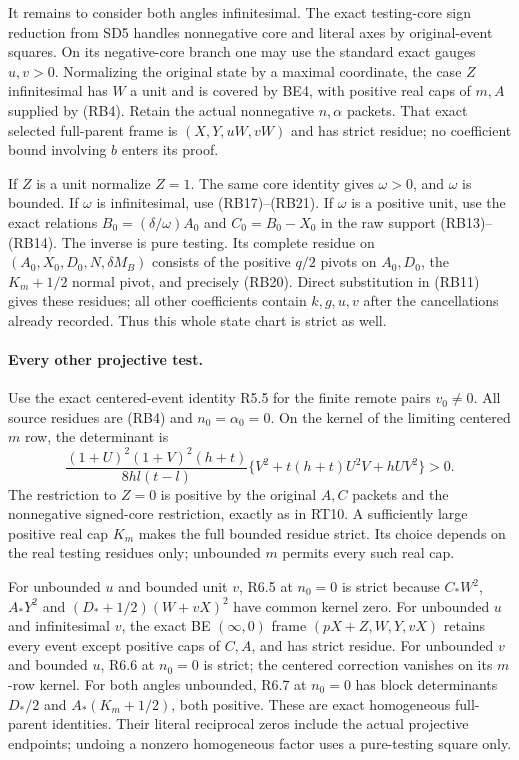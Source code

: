 It remains to consider both angles infinitesimal. The exact testing-core
sign reduction from SD5 handles nonnegative core and literal axes by
original-event squares. On its negative-core branch one may use the
standard exact gauges $u,v>0$. Normalizing the original state by a
maximal coordinate, the case $Z$ infinitesimal has $W$ a unit and is
covered by BE4, with positive real caps of $m,A$ supplied by (RB4).
Retain the actual nonnegative $n,\alpha$ packets. That exact selected
full-parent frame is $(X,Y,uW,vW)$ and has strict residue; no coefficient
bound involving $b$ enters its proof.

If $Z$ is a unit normalize $Z=1$. The same core identity gives
$\omega>0$, and $\omega$ is bounded. If $\omega$ is infinitesimal,
use (RB17)--(RB21). If $\omega$ is a positive unit, use the exact
relations $B_0=(\delta/\omega)A_0$ and $C_0=B_0-X_0$ in the raw
support (RB13)--(RB14). The inverse is pure testing. Its complete
residue on $(A_0,X_0,D_0,N,\delta M_B)$ consists of the positive
$q/2$ pivots on $A_0,D_0$, the $K_m+1/2$ normal pivot, and precisely
(RB20). Direct substitution in (RB11) gives these residues; all other
coefficients contain $k,g,u,v$ after the cancellations already recorded.
Thus this whole state chart is strict as well.

\paragraph{Every other projective test.}
Use the exact centered-event identity R5.5 for the finite remote pairs
$v_0\ne0$. All source residues are (RB4) and $n_0=\alpha_0=0$.
On the kernel of the limiting centered $m$ row, the determinant is
\[
 \frac{(1+U)^2(1+V)^2(h+t)}{8hl(t-l)}
       \{V^2+t(h+t)U^2V+hUV^2\}>0.                 \tag{RB24}
\]
The restriction to $Z=0$ is positive by the original $A,C$ packets
and the nonnegative signed-core restriction, exactly as in RT10.
A sufficiently large positive real cap $K_m$ makes the full bounded
residue strict. Its choice depends on the real testing residues only;
unbounded $m$ permits every such real cap.

For unbounded $u$ and bounded unit $v$, R6.5 at $n_0=0$ is strict
because $C_*W^2$, $A_*Y^2$ and $(D_*+1/2)(W+vX)^2$ have common
kernel zero. For unbounded $u$ and infinitesimal $v$, the exact
BE $(\infty,0)$ frame $(pX+Z,W,Y,vX)$ retains every event except
positive caps of $C,A$, and has strict residue. For unbounded $v$
and bounded $u$, R6.6 at $n_0=0$ is strict; the centered correction
vanishes on its $m$-row kernel. For both angles unbounded, R6.7 at
$n_0=0$ has block determinants $D_*/2$ and
$A_*(K_m+1/2)$, both positive. These are exact homogeneous full-parent
identities. Their literal reciprocal zeros include the actual projective
endpoints; undoing a nonzero homogeneous factor uses a pure-testing
square only.

